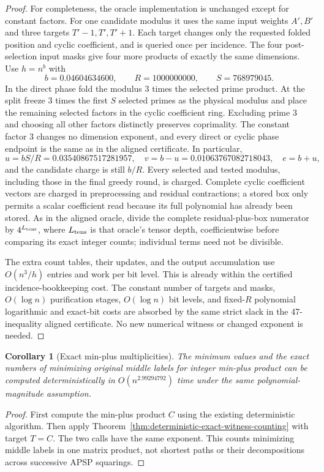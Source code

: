 \documentclass[11pt]{article}
\newtheorem{corollary}[theorem]{Corollary}
\begin{document}
\begin{proof}
For completeness, the oracle implementation is unchanged except for
constant factors.  For one candidate modulus it uses the same input
weights $A',B'$ and three targets $T'-1,T',T'+1$.  Each target changes
only the requested folded position and cyclic coefficient, and is
queried once per incidence.  The four post-selection input masks give
four more products of exactly the same dimensions.  Use $h=n^b$ with
\[
 b=0.04604634600,\qquad R=1000000000,\qquad S=768979045.
\]
In the direct phase fold the modulus $3$ times the selected prime
product.  At the split freeze $3$ times the first $S$ selected primes
as the physical modulus and place the remaining selected factors in
the cyclic coefficient ring.  Excluding prime $3$ and choosing all
other factors distinctly preserves coprimality.  The constant factor
$3$ changes no dimension exponent, and every direct or cyclic phase
endpoint is the same as in the aligned certificate.  In particular,
\[
 u=bS/R=0.03540867517281957,\quad
 v=b-u=0.01063767082718043,\quad e=b+u,
\]
and the candidate charge is still $b/R$.  Every selected and tested
modulus, including those in the final greedy round, is charged.
Complete cyclic coefficient vectors are charged in preprocessing and
residual contractions; a stored box only permits a scalar coefficient
read because its full polynomial has already been stored.  As in the
aligned oracle, divide the complete residual-plus-box numerator by
$4^{L_{\rm tens}}$, where $L_{\rm tens}$ is that oracle's tensor depth,
coefficientwise before comparing its exact integer counts;
individual terms need not be divisible.

The extra count tables, their updates, and the output accumulation use
$O(n^3/h)$ entries and work per bit level.  This is already within
the certified incidence-bookkeeping cost.  The constant number of
targets and masks, $O(\log n)$ purification stages, $O(\log n)$ bit
levels, and fixed-$R$ polynomial logarithmic and exact-bit costs are
absorbed by the same strict slack in the 47-inequality aligned
certificate.  No new numerical witness or changed exponent is needed.
\end{proof}

\begin{corollary}[Exact min-plus multiplicities]
\label{cor:exact-minplus-multiplicities}
The minimum values and the exact numbers of minimizing original middle
labels for integer min-plus product can be computed deterministically in
$O(n^{2.99294792})$ time under the same polynomial-magnitude assumption.
\end{corollary}
\begin{proof}
First compute the min-plus product $C$ using the existing deterministic
algorithm.  Then apply Theorem~\ref{thm:deterministic-exact-witness-counting}
with target $T=C$.  The two calls have the same exponent.  This counts
minimizing middle labels in one matrix product, not shortest paths or
their decompositions across successive APSP squarings.
\end{proof}
\end{document}

